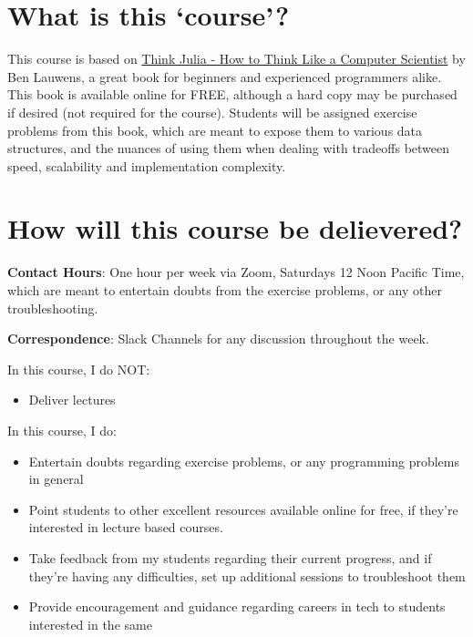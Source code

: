 \documentclass{article}
\begin{document}
\section{What is this `course'?}
This course is based on \href{https://benlauwens.github.io/ThinkJulia.jl/latest/book.html}{Think Julia - How to Think Like a Computer Scientist} by Ben Lauwens, a great book for beginners and experienced programmers alike. This book is available online for FREE, although a hard copy may be purchased if desired (not required for the course). Students will be assigned exercise problems from this book, which are meant to expose them to various data structures, and the nuances of using them when dealing with tradeoffs between speed, scalability and implementation complexity.

\section{How will this course be delievered?}

\textbf{Contact Hours}: One hour per week via Zoom, Saturdays 12 Noon Pacific Time, which are meant to entertain doubts from the exercise problems, or any other troubleshooting. 

\textbf{Correspondence}: Slack Channels for any discussion throughout the week.

In this course, I do NOT:
\begin{itemize}
    \item Deliver lectures
\end{itemize}

In this course, I do:
\begin{itemize}
    \item Entertain doubts regarding exercise problems, or any programming problems in general
    \item Point students to other excellent resources available online for free, if they're interested in lecture based courses.
    \item Take feedback from my students regarding their current progress, and if they're having any difficulties, set up additional sessions to troubleshoot them
    \item Provide encouragement and guidance regarding careers in tech to students interested in the same
\end{itemize}
\end{document}
